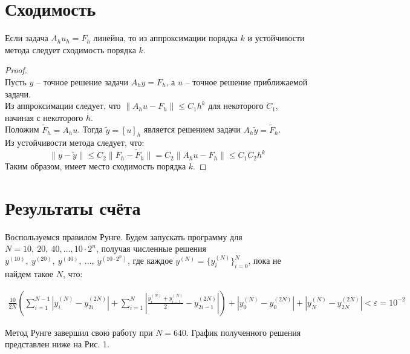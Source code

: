 \documentclass[titlepage]{article}
\def\l{\left}
\def\r{\right}
\def\le{\leqslant}
\begin{document}
\section{Сходимость}
\begin{theorem}
	Если задача $A_h u_h = F_h$ линейна, то из аппроксимации порядка $k$ и устойчивости метода следует сходимость порядка $k$.
\end{theorem}
\begin{proof}
\hfill \\
Пусть $y$ -- точное решение задачи $A_hy = F_h$, а $u$ -- точное решение приближаемой задачи. \\
Из аппроксимации следует, что $\|A_hu - F_h\| \le C_1h^k$ для некоторого $C_1$, начиная с некоторого $h$. \\
Положим $\tilde F_h = A_h u$. Тогда $\tilde y = [u]_h$ является решением задачи $A_h \tilde y = \tilde F_h$. \\
Из устойчивости метода следует, что:
$$\| y - \tilde y \| \le C_2 \| F_h - \tilde F_h \| = C_2 \| A_h u - F_h \| \le C_1 C_2 h^k$$ 
Таким образом, имеет место сходимость порядка $k$.
\end{proof}

\section{Результаты счёта}
Воспользуемся правилом Рунге. Будем запускать программу для $N = 10,\ 20,\ 40,\dots,10\cdot2^n$, получая численные решения $y^{(10)},\ y^{(20)},\  y^{(40)},\ \dots ,\  y^{(10\cdot2^n)}$, где каждое $y^{(N)} = \{y_i^{(N)}\}_{i=0}^{N}$, пока не найдем такое $N$, что:

\begin{gather*}
	\frac{10}{2N} \l( \sum_{i=1}^{N-1}{\l| y_i^{(N)} - y_{2i}^{(2N)} \r|} + \sum_{i=1}^{N}{ \l| \frac{y_i^{(N)} + y_{i-1}^{(N)}}{2}  - y_{2i-1}^{(2N)} \r|} \r) + \l|y_0^{(N)} - y_{0}^{(2N)}\r| + \l|y_N^{(N)} - y_{2N}^{(2N)}\r| < \varepsilon = 10^{-2}
\end{gather*}

Метод Рунге завершил свою работу при $N = 640$. График полученного решения представлен ниже на Рис. 1.

	
\end{document}
